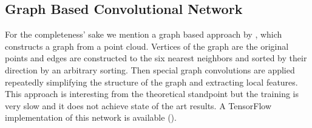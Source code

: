 \subsection{Graph Based Convolutional Network}
For the completeness’ sake we mention a graph based approach by \cite{dominguez_general-purpose_2018}, which constructs a graph from a point cloud. Vertices of the graph are the original points and edges are constructed to the six nearest neighbors and sorted by their direction by an arbitrary sorting. Then special graph convolutions are applied repeatedly simplifying the structure of the graph and extracting local features. This approach is interesting from the theoretical standpoint but the training is very slow and it does not achieve state of the art results. A TensorFlow implementation of this network is available (\cite{dominguez_g3dnet_2018}).



